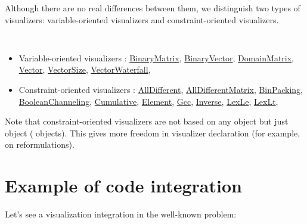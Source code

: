  Although there are no real differences between them, we distinguish two types of visualizers: variable-oriented visualizers and constraint-oriented visualizers.
\medskip
\begin{notedef}\tt
\begin{itemize}
\item Variable-oriented visualizers : \hyperlink{binarymatrix:visu}{BinaryMatrix}, \hyperlink{binaryvector:visu}{BinaryVector}, \hyperlink{domainmatrix:visu}{DomainMatrix}, \hyperlink{vector:visu}{Vector}, \hyperlink{vectorsize:visu}{VectorSize}, \hyperlink{vectorwaterfall:visu}{VectorWaterfall},
\item Constraint-oriented visualizers : \hyperlink{alldiff:visu}{AllDifferent}, \hyperlink{alldiffmatrix:visu}{AllDifferentMatrix}, \hyperlink{binpacking:visu}{BinPacking}, \hyperlink{boolchan:visu}{BooleanChanneling}, \hyperlink{cumulative:visu}{Cumulative}, \hyperlink{element:visu}{Element}, \hyperlink{gcc:visu}{Gcc}, \hyperlink{inverse:visu}{Inverse}, \hyperlink{lexle:visu}{LexLe}, \hyperlink{lexlt:visu}{LexLt},    
\end{itemize}
\end{notedef}
Note that constraint-oriented visualizers are not based on any  object but just  object ( objects). This gives more freedom in visualizer declaration (for example, on reformulations).

\section{Example of code integration}\label{chocoandcpviz:codeintegration}\hypertarget{chocoandcpviz:codeintegration}{}
Let's see a visualization integration in the well-known  problem:

